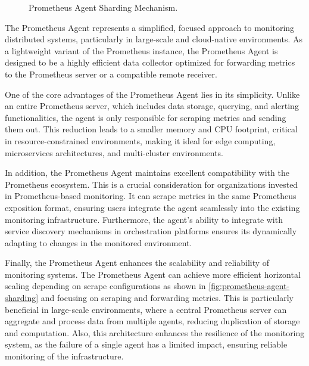 \begin{figure}[htpb]
  \caption[Prometheus Agent Sharding]{Prometheus Agent Sharding Mechanism.}\label{fig:prometheus-agent-sharding}
\end{figure}

The Prometheus Agent represents a simplified, focused approach to monitoring distributed systems, particularly in large-scale and cloud-native environments. As a lightweight variant of the Prometheus instance, the Prometheus Agent is designed to be a highly efficient data collector optimized for forwarding metrics to the Prometheus server or a compatible remote receiver. 

One of the core advantages of the Prometheus Agent lies in its simplicity. Unlike an entire Prometheus server, which includes data storage, querying, and alerting functionalities, the agent is only responsible for scraping metrics and sending them out. This reduction leads to a smaller memory and CPU footprint, critical in resource-constrained environments, making it ideal for edge computing, microservices architectures, and multi-cluster environments. 

In addition, the Prometheus Agent maintains excellent compatibility with the Prometheus ecosystem. This is a crucial consideration for organizations invested in Prometheus-based monitoring. It can scrape metrics in the same Prometheus exposition format, ensuring users integrate the agent seamlessly into the existing monitoring infrastructure. Furthermore, the agent's ability to integrate with service discovery mechanisms in orchestration platforms ensures its dynamically adapting to changes in the monitored environment. 

Finally, the Prometheus Agent enhances the scalability and reliability of monitoring systems. The Prometheus Agent can achieve more efficient horizontal scaling depending on scrape configurations as shown in \autoref{fig:prometheus-agent-sharding} and focusing on scraping and forwarding metrics. This is particularly beneficial in large-scale environments, where a central Prometheus server can aggregate and process data from multiple agents, reducing duplication of storage and computation. Also, this architecture enhances the resilience of the monitoring system, as the failure of a single agent has a limited impact, ensuring reliable monitoring of the infrastructure. 

